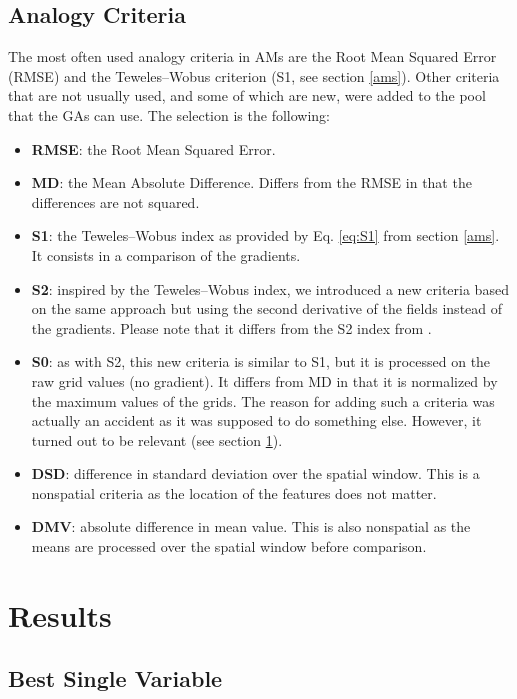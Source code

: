 \documentclass[draft]{agujournal2019}
\begin{document}
\subsection{Analogy Criteria}
\label{criteria}

The most often used analogy criteria in AMs are the Root Mean Squared Error (RMSE) and the Teweles--Wobus criterion (S1, see section \ref{ams}). Other criteria that are not usually used, and some of which are new, were added to the pool that the GAs can use. The selection is the following:

\begin{itemize}
	\item \textbf{RMSE}: the Root Mean Squared Error.
	\item \textbf{MD}: the Mean Absolute Difference. Differs from the RMSE in that the differences are not squared.
	\item \textbf{S1}: the Teweles--Wobus index as provided by Eq. \ref{eq:S1} from section \ref{ams}. It consists in a comparison of the gradients. 
	\item \textbf{S2}: inspired by the Teweles--Wobus index, we introduced a new criteria based on the same approach but using the second derivative of the fields instead of the gradients. Please note that it differs from the S2 index from .
	\item \textbf{S0}: as with S2, this new criteria is similar to S1, but it is processed on the raw grid values (no gradient). It differs from MD in that it is normalized by the maximum values of the grids. The reason for adding such a criteria was actually an accident as it was supposed to do something else. However, it turned out to be relevant (see section \ref{results}).
	\item \textbf{DSD}: difference in standard deviation over the spatial window. This is a nonspatial criteria as the location of the features does not matter.
	\item \textbf{DMV}: absolute difference in mean value. This is also nonspatial as the means are processed over the spatial window before comparison.
\end{itemize}



\section{Results}
\label{results}

\subsection{Best Single Variable}
\label{best_single}
\end{document}
